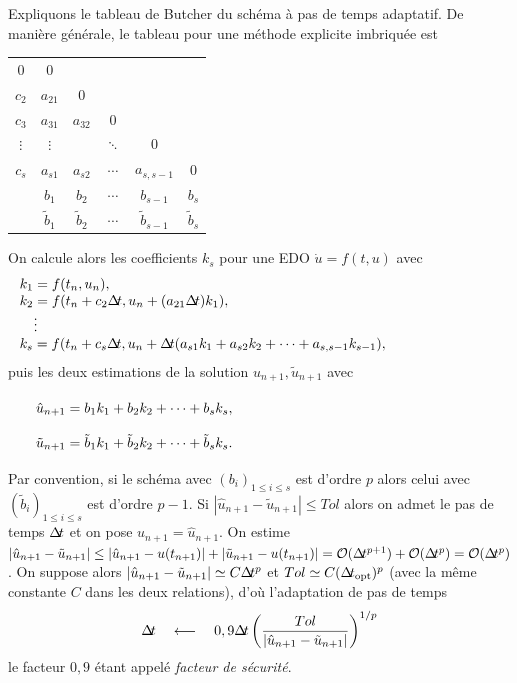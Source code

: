 Expliquons le tableau de Butcher du schéma à pas de temps adaptatif. De manière générale, le tableau pour une méthode explicite imbriquée est 
\begin{center}
\begin{tabular}{c|ccccc}
    0    &     0    &          &    &    &    \\
  $c_2$  & $a_{21}$ &     0    &        &   &   \\
  $c_3$  & $a_{31}$ & $a_{32}$ &  0  &   &    \\
$\vdots$ & $\vdots$ &          &  $\ddots$ &  0  &   \\
  $c_s$  & $a_{s1}$ & $a_{s2}$ & $\cdots$ & $a_{s,s-1}$ &  0  \\ \hline
         & $b_1$  & $b_2$ & $\cdots$ & $b_{s-1}$ & $b_s$  \\ 
         & $\tilde{b}_1$  & $\tilde{b}_2$ & $\cdots$ & $\tilde{b}_{s-1}$ & $\tilde{b}_s$
\end{tabular}
\end{center}
On calcule alors les coefficients $k_s$ pour une EDO $\dot{u} = f(t,u)$ avec 
$$ \begin{array}{l}
k_1 = f(t_n,u_n), \\
k_2 = f(t_n+c_2\dt, u_n + (a_{21}\dt) k_1), \\
\quad \vdots \\
k_s = f(t_n+c_s\dt, u_n + \dt(a_{s1}k_1 + a_{s2}k_2 + \cdots + a_{s,s-1}k_{s-1}), \qquad\qquad\qquad\qquad\vphantom{0}
\end{array} $$
puis les deux estimations de la solution $\hat{u}_{n+1},\tilde{u}_{n+1}$ avec 
$$ \begin{array}{l}
\hat{u}_{n+1} = b_1 k_1 + b_2 k_2 + \cdots + b_s k_s , \vphantom{\displaystyle\int_0^1} \\
\tilde{u}_{n+1} = \tilde{b}_1 k_1 + \tilde{b}_2 k_2 + \cdots + \tilde{b}_s k_s .
\qquad\qquad\qquad\qquad\qquad\qquad\qquad\qquad\qquad\vphantom{\displaystyle\int_0^1}
\end{array} $$
Par convention, si le schéma avec $(b_i)_{1\leq i\leq s}$ est d'ordre $p$ alors celui avec $(\tilde{b}_i)_{1\leq i \leq s}$ est d'ordre $p-1$. 
Si $|\hat{u}_{n+1}-\tilde{u}_{n+1}| \leq Tol$ alors on admet le pas de temps $\Delta\!\!\!\ t$ et on pose $u_{n+1} = \hat{u}_{n+1}$. On estime $|\hat{u}_{n+1}-\tilde{u}_{n+1}| \leq |\hat{u}_{n+1}-u(t_{n+1})| + |\tilde{u}_{n+1}- u(t_{n+1})| = \O(\dt^{p+1}) + \O(\dt^p) = \O(\dt^p)$. 
On suppose alors $|\hat{u}_{n+1}-\tilde{u}_{n+1}| \simeq C \Delta\!\!\!\ t^p$ et $Tol \simeq C (\Delta\!\!\!\ t_{\text{opt}})^p$ (avec la même constante $C$ dans les deux relations), d'où l'adaptation de pas de temps 
$$ \Delta\!\!\!\ t \quad \longleftarrow \quad 0,9 \Delta\!\!\!\ t \left( \frac{Tol}{|\hat{u}_{n+1}-\tilde{u}_{n+1}|} \right)^{1/p} $$
le facteur $0,9$ étant appelé \textit{facteur de sécurité}. 

